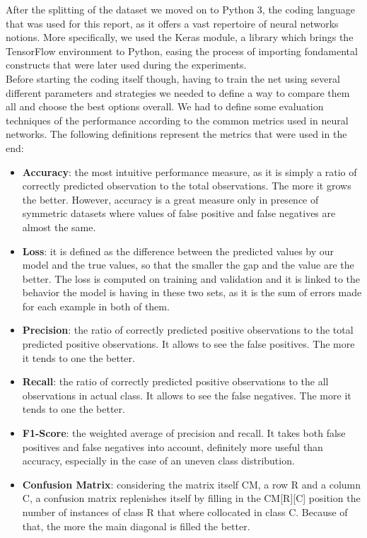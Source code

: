 \documentclass[12pt,a4paper]{report}
\begin{document}
After the splitting of the dataset we moved on to Python 3, the coding language that was used for this report, as it offers a vast repertoire of neural networks notions. More specifically, we used the Keras module, a library which brings the TensorFlow environment to Python, easing the process of importing fondamental constructs that were later used during the experiments. \\
Before starting the coding itself though, having to train the net using several different parameters and strategies we needed to define a way to compare them all and choose the best options overall. We had to define some evaluation techniques of the performance according to the common metrics used in neural networks. The following definitions represent the metrics that were used in the end:
\begin{itemize}
\item \textbf{Accuracy}: the most intuitive performance measure, as it is simply a ratio of correctly predicted observation to the total observations. The more it grows the better. However, accuracy is a great measure only in presence of symmetric datasets where values of false positive and false negatives are almost the same.
\item \textbf{Loss}: it is defined as the difference between the predicted values by our model and the true values, so that the smaller the gap and the value are the better. The loss is computed on training and validation and it is linked to the behavior the model is having in these two sets, as it is the sum of errors made for each example in both of them.
\item \textbf{Precision}: the ratio of correctly predicted positive observations to the total predicted positive observations. It allows to see the false positives. The more it tends to one the better.
\item \textbf{Recall}: the ratio of correctly predicted positive observations to the all observations in actual class. It allows to see the false negatives. The more it tends to one the better.
\item \textbf{F1-Score}: the weighted average of precision and recall. It takes both false positives and false negatives into account, definitely more useful than accuracy, especially in the case of an uneven class distribution.
\item \textbf{Confusion Matrix}: considering the matrix itself CM, a row R and a column C, a confusion matrix replenishes itself by filling in the CM[R][C] position the number of instances of class R that where collocated in class C. Because of that, the more the main diagonal is filled the better.
\end{itemize}
\end{document}
